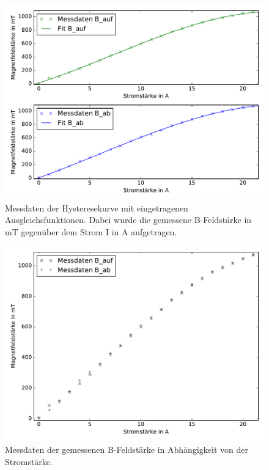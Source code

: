 \begin{figure}
  \centering
  \includegraphics[width=\textwidth]{Python/Hysterese.pdf}
  \caption{Messdaten der Hysteresekurve mit eingetragenen Ausgleichsfunktionen.
  Dabei wurde die gemessene B-Feldstärke in mT gegenüber dem Strom I in A aufgetragen.}
  \label{fig:Hysterese}
\end{figure}

\begin{figure}
  \centering
  \includegraphics[width=\textwidth]{Python/Hysterese_Messdaten.pdf}
  \caption{Messdaten der gemessenen B-Feldstärke in Abhängigkeit von der Stromstärke.}
  \label{fig:Hysterese_Messdaten}
\end{figure}

